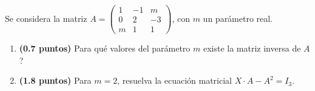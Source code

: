 
Se considera la matriz
$A=\begin{pmatrix}1&-1&m\\0&2&-3\\m&1&1\end{pmatrix}$,
con $m$ un parámetro real.
\begin{enumerate}[label=\alph*)]
  \item \textbf{(0.7 puntos)} \textquestiondown{}Para qué valores del
  parámetro $m$ existe la matriz inversa de $A$?
  \item \textbf{(1.8 puntos)} Para $m=2$, resuelva la ecuación matricial
  $X\cdot A-A^2=I_3$.
\end{enumerate}
